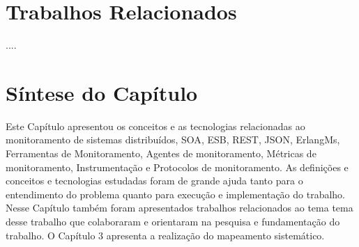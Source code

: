 
\section{Trabalhos Relacionados}

....


\section{Síntese do Capítulo}

Este Capítulo apresentou os conceitos e as tecnologias relacionadas ao monitoramento de sistemas distribuídos, \acrshort{SOA}, \acrshort{ESB},  \acrshort{REST}, \acrshort{JSON}, ErlangMs, Ferramentas de Monitoramento, Agentes de monitoramento, Métricas de monitoramento, Instrumentação e Protocolos de monitoramento. As definições e conceitos e tecnologias estudadas foram de grande ajuda tanto para o entendimento do problema quanto para execução e implementação do trabalho. Nesse Capítulo também foram apresentados trabalhos relacionados ao tema tema desse trabalho que colaboraram e orientaram na pesquisa e fundamentação do trabalho. O Capítulo 3 apresenta a realização do mapeamento sistemático.

